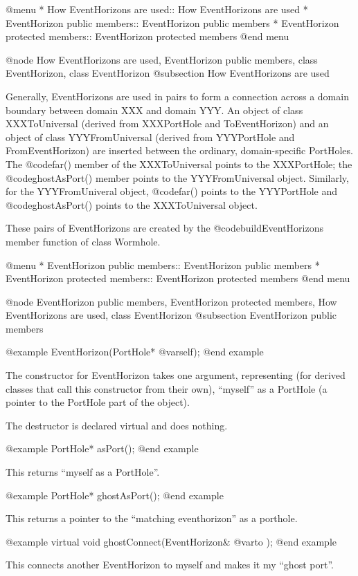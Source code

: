 @menu
* How EventHorizons are used::  How EventHorizons are used
* EventHorizon public members::  EventHorizon public members
* EventHorizon protected members::  EventHorizon protected members
@end menu

@node How EventHorizons are used, EventHorizon public members, class EventHorizon, class EventHorizon
@subsection How EventHorizons are used

Generally, EventHorizons are used in pairs to form a connection
across a domain boundary between domain XXX and domain YYY.  An object
of class XXXToUniversal (derived from XXXPortHole and ToEventHorizon)
and an object of class YYYFromUniversal (derived from YYYPortHole and
FromEventHorizon) are inserted between the ordinary, domain-specific
PortHoles.  The @code{far()} member of the XXXToUniversal points
to the XXXPortHole; the @code{ghostAsPort()} member points to
the YYYFromUniversal object.  Similarly, for the YYYFromUniveral
object, @code{far()} points to the YYYPortHole and @code{ghostAsPort()}
points to the XXXToUniversal object.

These pairs of EventHorizons are created by the
@code{buildEventHorizons} member function of class Wormhole.

@menu
* EventHorizon public members::  EventHorizon public members
* EventHorizon protected members::  EventHorizon protected members
@end menu

@node EventHorizon public members, EventHorizon protected members, How EventHorizons are used, class EventHorizon
@subsection EventHorizon public members

@example
EventHorizon(PortHole* @var{self});
@end example

The constructor for EventHorizon takes one argument, representing (for
derived classes that call this constructor from their own), ``myself'' as
a PortHole (a pointer to the PortHole part of the object).

The destructor is declared virtual and does nothing.

@example
PortHole* asPort();
@end example

This returns ``myself as a PortHole''.

@example
PortHole* ghostAsPort();
@end example

This returns a pointer to the ``matching eventhorizon'' as a porthole.

@example
virtual void ghostConnect(EventHorizon& @var{to} );
@end example

This connects another EventHorizon to myself and makes it my ``ghost
port''.

